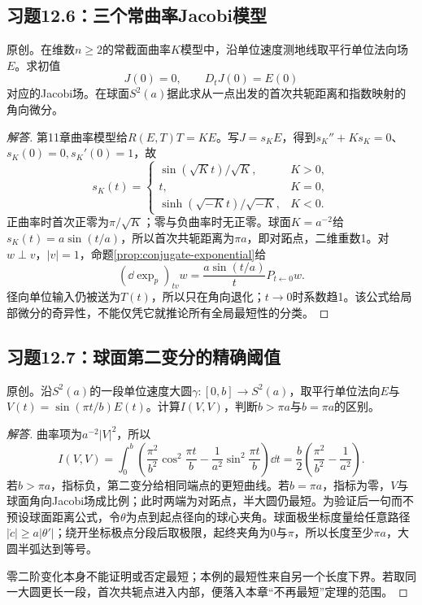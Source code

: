 \subsection*{习题12.6：三个常曲率Jacobi模型}
原创。在维数$n\geq2$的常截面曲率$K$模型中，沿单位速度测地线取平行单位法向场$E$。求初值
\[
 J(0)=0,\qquad D_tJ(0)=E(0)
\]
对应的Jacobi场。在球面$S^2(a)$据此求从一点出发的首次共轭距离和指数映射的角向微分。
\begin{proof}[解答]
第11章曲率模型给$R(E,T)T=KE$。写$J=s_K E$，得到$s_K''+Ks_K=0$、$s_K(0)=0,s_K'(0)=1$，故
\[
 s_K(t)=\begin{cases}
 \sin(\sqrt Kt)/\sqrt K,&K>0,\\
 t,&K=0,\\
 \sinh(\sqrt{-K}t)/\sqrt{-K},&K<0.
 \end{cases}
\]
正曲率时首次正零为$\pi/\sqrt K$；零与负曲率时无正零。球面$K=a^{-2}$给$s_K(t)=a\sin(t/a)$，所以首次共轭距离为$\pi a$，即对跖点，二维重数1。对$w\perp v$，$|v|=1$，命题\ref{prop:conjugate-exponential}给
\[
 (\dd\exp_p)_{tv}w=\frac{a\sin(t/a)}tP_{t\leftarrow0}w.
\]
径向单位输入仍被送为$T(t)$，所以只在角向退化；$t\to0$时系数趋1。该公式给局部微分的奇异性，不能仅凭它就推论所有全局最短性的分类。
\end{proof}

\subsection*{习题12.7：球面第二变分的精确阈值}
原创。沿$S^2(a)$的一段单位速度大圆$\gamma:[0,b]\to S^2(a)$，取平行单位法向$E$与$V(t)=\sin(\pi t/b)E(t)$。计算$I(V,V)$，判断$b>\pi a$与$b=\pi a$的区别。
\begin{proof}[解答]
曲率项为$a^{-2}|V|^2$，所以
\[
 I(V,V)=\int_0^b\left(\frac{\pi^2}{b^2}\cos^2\frac{\pi t}b
 -\frac1{a^2}\sin^2\frac{\pi t}b\right)\dd t
 =\frac b2\left(\frac{\pi^2}{b^2}-\frac1{a^2}\right).
\]
若$b>\pi a$，指标负，第二变分给相同端点的更短曲线。若$b=\pi a$，指标为零，$V$与球面角向Jacobi场成比例；此时两端为对跖点，半大圆仍最短。为验证后一句而不预设球面距离公式，令$\theta$为点到起点径向的球心夹角。球面极坐标度量给任意路径$|\dot c|\geq a|\theta'|$；绕开坐标极点分段后取极限，起终夹角为0与$\pi$，所以长度至少$\pi a$，大圆半弧达到等号。

零二阶变化本身不能证明或否定最短；本例的最短性来自另一个长度下界。若取同一大圆更长一段，首次共轭点进入内部，便落入本章“不再最短”定理的范围。
\end{proof}


